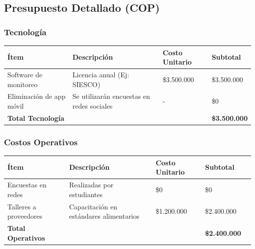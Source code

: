 \documentclass[letterpaper, 11pt]{report}
\begin{document}
\subsection{Presupuesto Detallado (COP)}

\subsubsection{Tecnología}

\begin{longtable}{|p{.25\linewidth}|p{.25\linewidth}|p{.25\linewidth}|p{.25\linewidth}|}
      \hline
      \textbf{Ítem}             & \textbf{Descripción}                      & \textbf{Costo Unitario} & \textbf{Subtotal}    \\
      \hline
      Software de monitoreo     & Licencia anual (Ej: SIESCO)               & \$3.500.000             & \$3.500.000          \\
      \hline
      Eliminación de app móvil  & Se utilizarán encuestas en redes sociales & -                       & \$0                  \\
      \hline
      \textbf{Total Tecnología} &                                           &                         & \textbf{\$3.500.000} \\
      \hline
\end{longtable}

\subsubsection{Costos Operativos}

\begin{longtable}{|p{0.25\linewidth}|p{0.35\linewidth}|p{0.20\linewidth}|p{0.20\linewidth}|}
      \hline
      \textbf{Ítem}             & \textbf{Descripción}                    & \textbf{Costo Unitario} & \textbf{Subtotal}    \\
      \hline
      Encuestas en redes        & Realizadas por estudiantes              & \$0                     & \$0                  \\
      \hline
      Talleres a proveedores    & Capacitación en estándares alimentarios & \$1.200.000             & \$2.400.000          \\
      \hline
      \textbf{Total Operativos} &                                         &                         & \textbf{\$2.400.000} \\
      \hline
\end{longtable}
\end{document}
